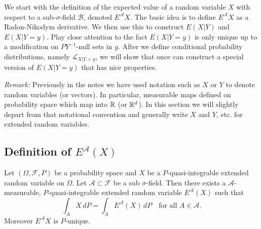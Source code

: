We start with the definition of the expected value of a random variable $X$ with respect to a sub-$\sigma$-field $\mathcal B$, denoted $E^{\mathcal A}X$. The basic idea is to define $E^{\mathcal A}X$ as a Radon-Nikodym derivative. We then use this to construct $E(X|Y)$ and $E(X|Y=y)$. Play close attention to the fact $E(X|Y=y)$ is only unique up to a modification on $PY^{-1}$-null sets in $y$. After we define conditional probability distributions, namely $\mathcal L_{X|Y = y}$, we will show that once can construct a special version of $E(X|Y=y)$ that has nice properties.

{\em Remark:} Previously in the notes we have used notation such as $X$ or $Y$ to denote random variables (or vectors). In particular, measurable maps defined on probability space which map  into $\Bbb R$ (or $\Bbb R^d$). In this section we will slightly depart from that notational convention and generally write $X$ and $Y$, etc. for extended random variables.

\subsection{Definition of $E^{\mathcal A}(X)$}
\begin{theorem}
Let $(\Omega, \mathcal F, P)$ be a probability space and $X$ be a $P$-quasi-integrable extended random variable on $\Omega$. Let $\mathcal A\subset \mathcal F$ be a sub $\sigma$-field. Then there exists a
$\mathcal A$-measurable, $P$-quasi-integrable extended random variable $E^{\mathcal A}(X)$
such that
\begin{equation}
\label{eq: smooth condition}
{\int_A X\, dP = \int_A E^{\mathcal A}(X) \, dP\quad\text{for all $A\in \mathcal A$.}}
\end{equation}
Moreover $E^{\mathcal A}X$ is $P$-unique.
\end{theorem}


